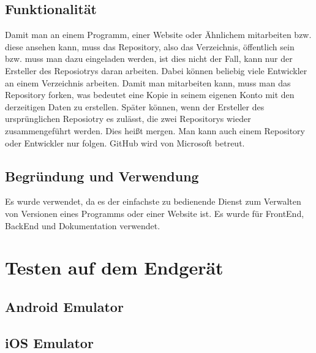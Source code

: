 \subsection*{Funktionalität}
Damit man an einem Programm, einer Website oder Ähnlichem mitarbeiten bzw. diese
ansehen kann, muss das Repository, also das Verzeichnis, öffentlich sein bzw. muss man
dazu eingeladen werden, ist dies nicht der Fall, kann nur der Ersteller des Reposiotrys
daran arbeiten.
Dabei können beliebig viele Entwickler an einem Verzeichnis arbeiten. Damit man
mitarbeiten kann, muss man das Repository forken, was bedeutet eine Kopie in seinem
eigenen Konto mit den derzeitigen Daten zu erstellen.
Später können, wenn der Ersteller des ursprünglichen Reposiotry es zulässt, die zwei
Repositorys wieder zusammengeführt werden. Dies heißt mergen. Man kann auch einem
Repository oder Entwickler nur folgen. GitHub wird von Microsoft betreut.
\subsection*{Begründung und Verwendung}
Es wurde verwendet, da es der einfachste zu bedienende Dienst zum Verwalten von
Versionen eines Programms oder einer Website ist. Es wurde für FrontEnd, BackEnd
und Dokumentation verwendet.

\section{Testen auf dem Endgerät}
\subsection{Android Emulator}
\subsection{iOS Emulator}